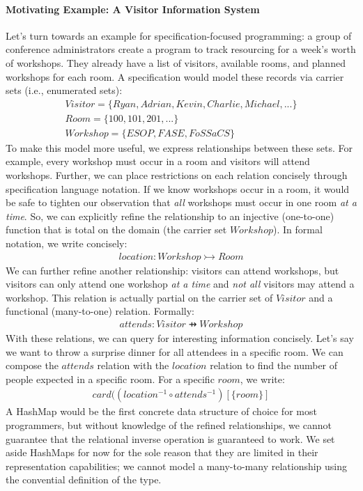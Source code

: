 \documentclass{article}
\begin{document}
\paragraph{Motivating Example: A Visitor Information System}
Let's turn towards an example for specification-focused programming: a group of conference administrators create a program to track resourcing for a week's worth of workshops. They already have a list of visitors, available rooms, and planned workshops for each room. A specification would model these records via carrier sets (i.e., enumerated sets):
\begin{gather*}
    Visitor = \{Ryan, Adrian, Kevin, Charlie, Michael, ...\}\\
    Room = \{100, 101, 201, ...\}\\
    Workshop = \{ESOP, FASE, FoSSaCS\}
\end{gather*}
To make this model more useful, we express relationships between these sets. For example, every workshop must occur in a room and visitors will attend workshops. Further, we can place restrictions on each relation concisely through specification language notation. If we know workshops occur in a room, it would be safe to tighten our observation that \textit{all} workshops must occur in one room \textit{at a time}. So, we can explicitly refine the relationship to an injective (one-to-one) function that is total on the domain (the carrier set $Workshop$). In formal notation, we write concisely:
\begin{gather*}
    location: Workshop \tinj Room
\end{gather*}
We can further refine another relationship: visitors can attend workshops, but visitors can only attend one workshop \textit{at a time} and \textit{not all} visitors may attend a workshop. This relation is actually partial on the carrier set of $Visitor$ and a functional (many-to-one) relation. Formally:
\begin{gather*}
    attends: Visitor \pfun Workshop
\end{gather*}
With these relations, we can query for interesting information concisely. Let's say we want to throw a surprise dinner for all attendees in a specific room. We can compose the $attends$ relation with the $location$ relation to find the number of people expected in a specific room. For a specific $room$, we write:
\begin{gather*}
    card((location^{-1} \circ attends^{-1})[\{room\}]
\end{gather*}
A HashMap would be the first concrete data structure of choice for most programmers, but without knowledge of the refined relationships, we cannot guarantee that the relational inverse operation is guaranteed to work. We set aside HashMaps for now for the sole reason that they are limited in their representation capabilities; we cannot model a many-to-many relationship using the convential definition of the type.
\end{document}
